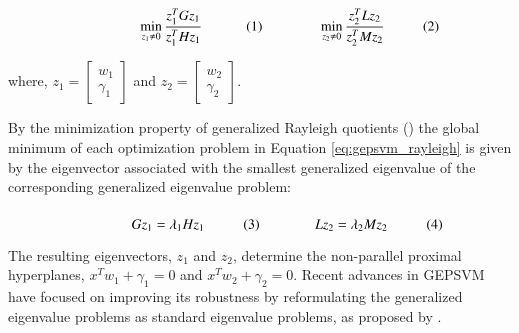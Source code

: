 \documentclass[12pt]{report} %
\begin{document}
\begin{subequations}
\begin{minipage}{0.38\textwidth}
\begin{equation}
\min_{z_1 \neq 0} \frac{z_1^{T}Gz_1}{z_1^{T}Hz_1}
\end{equation}
\end{minipage}
\hspace{0.1cm}
\begin{minipage}{0.36\textwidth}
\begin{equation}
\min_{z_2 \neq 0} \frac{z_2^{T}Lz_2}{z_2^{T}Mz_2}
\end{equation}
\end{minipage}
\label{eq:gepsvm_rayleigh}
\end{subequations}

where, $z_1 = \begin{bmatrix}
w_1\\ \gamma_1\end{bmatrix}$ and $z_2 = \begin{bmatrix}
w_2\\ \gamma_2\end{bmatrix}$.

By the minimization property of generalized Rayleigh quotients (\cite{parlett1998symmetric}) the global minimum of each optimization problem in Equation \ref{eq:gepsvm_rayleigh} is given by the eigenvector associated with the smallest generalized eigenvalue of the corresponding generalized eigenvalue problem:

\begin{subequations}
\begin{minipage}{0.38\textwidth}
\begin{equation}
Gz_1 = \lambda_1 Hz_1
\end{equation}
\end{minipage}
\begin{minipage}{0.38\textwidth}
\begin{equation}
Lz_2 = \lambda_2 Mz_2
\end{equation}
\end{minipage}
\end{subequations}

The resulting eigenvectors, $z_1$ and $z_2$, determine the non-parallel proximal hyperplanes, $x^{T}w_1+\gamma_1 = 0$ and $x^{T}w_2 + \gamma_2 = 0$. Recent advances in GEPSVM have focused on improving its robustness by reformulating the generalized eigenvalue problems as standard eigenvalue problems, as proposed by \cite{ye2009improved}.
\end{document}
